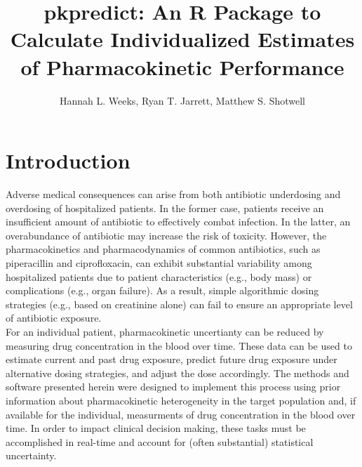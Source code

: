 \documentclass{article}\usepackage[]{graphicx}\usepackage[]{color}
\title{pkpredict: An R Package to Calculate Individualized Estimates of Pharmacokinetic Performance}
\author{Hannah L. Weeks, Ryan T. Jarrett, Matthew S. Shotwell} %
\begin{document}

\section{Introduction}

Adverse medical consequences can arise from both antibiotic underdosing and overdosing of hospitalized patients. In the former case, patients receive an insufficient amount of antibiotic to effectively combat infection. In the latter, an overabundance of antibiotic may increase the risk of toxicity. However, the pharmacokinetics and pharmacodynamics of common antibiotics, such as piperacillin and ciprofloxacin, can exhibit substantial variability among hospitalized patients due to patient characteristics (e.g., body mass) or complications (e.g., organ failure). As a result, simple algorithmic dosing strategies (e.g., based on creatinine alone) can fail to ensure an appropriate level of antibiotic exposure.\\

For an individual patient, pharmacokinetic uncertianty can be reduced by measuring drug concentration in the blood over time. These data can be used to estimate current and past drug exposure, predict future drug exposure under alternative dosing strategies, and adjust the dose accordingly. The methods and software presented herein were designed to implement this process using prior information about pharmacokinetic heterogeneity in the target population and, if available for the individual, measurments of drug concentration in the blood over time. In order to impact clinical decision making, these tasks must be accomplished in real-time and account for (often substantial) statistical uncertainty.\\
\end{document}
